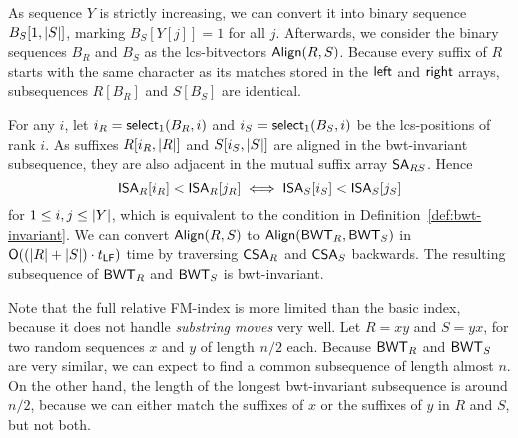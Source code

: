 As sequence $Y$ is strictly increasing, we can convert it into binary sequence
$B_{S}[1,\lvert S \rvert]$, marking $B_{S}[Y[j]] = 1$ for all $j$.
Afterwards, we consider the binary sequences $B_{R}$ and $B_{S}$ as the
lcs-bitvectors $\mathsf{Align}(R,S)$. Because every suffix of $R$ starts with the same
character as its matches stored in the $\mathsf{left}$ and $\mathsf{right}$ arrays,
subsequences $R[B_{R}]$ and $S[B_{S}]$ are identical.

For any $i$, let $i_{R} = \mathsf{select}_{1}(B_{R}, i)$ and $i_{S} =
\mathsf{select}_{1}(B_{S}, i)$ be the lcs-positions of rank $i$. As suffixes
$R[i_{R}, \lvert R \rvert]$ and $S[i_{S}, \lvert S \rvert]$ are aligned in the bwt-invariant
subsequence, they are also adjacent in the mutual suffix array $\mathsf{SA}_{RS}$.
Hence
$$
\mathsf{ISA}_{R}[i_{R}] < \mathsf{ISA}_{R}[j_{R}] \iff \mathsf{ISA}_{S}[i_{S}] < \mathsf{ISA}_{S}[j_{S}]
$$
for $1 \le i,j \le \lvert Y \rvert$, which is equivalent to the condition in
Definition~\ref{def:bwt-invariant}. We can convert $\mathsf{Align}(R,S)$ to
$\mathsf{Align}(\mathsf{BWT}_{R},\mathsf{BWT}_{S})$ in $\mathsf{O}((\lvert R \rvert+\lvert S \rvert) \cdot t_{\mathsf{LF}})$ time by
traversing $\mathsf{CSA}_{R}$ and $\mathsf{CSA}_{S}$ backwards. The resulting subsequence of
$\mathsf{BWT}_{R}$ and $\mathsf{BWT}_{S}$ is bwt-invariant.

Note that the full relative FM-index is more limited than the basic index,
because it does not handle \emph{substring moves} very well. Let $R = xy$ and
$S = yx$, for two random sequences $x$ and $y$ of length $n/2$ each. Because
$\mathsf{BWT}_{R}$ and $\mathsf{BWT}_{S}$ are very similar, we can expect to find a common
subsequence of length almost $n$. On the other hand, the length of the longest
bwt-invariant subsequence is around $n/2$, because we can either match the
suffixes of $x$ or the suffixes of $y$ in $R$ and $S$, but not both.

